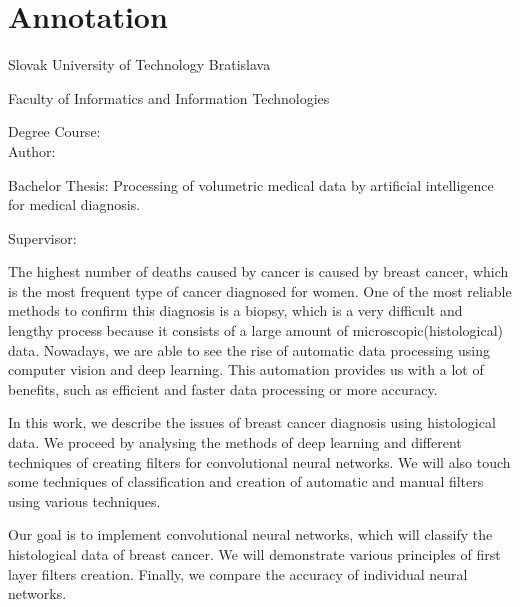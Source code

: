 \thispagestyle{empty}

\section*{Annotation}

\begin{minipage}[t]{1\columnwidth}%
Slovak University of Technology Bratislava 

Faculty of Informatics and Information Technologies

Degree Course: \myStudyProgram\\

Author: \myName

Bachelor Thesis: Processing of volumetric medical data by artificial intelligence for medical diagnosis.

Supervisor: \mySupervisor

\myDate%
\end{minipage}

\bigskip{}
\hspace{10mm}The highest number of deaths caused by cancer is caused by breast cancer, which is the most frequent type of cancer diagnosed for women. One of the most reliable methods to confirm this diagnosis is a biopsy, which is a very difficult and lengthy process because it consists of a large amount of microscopic(histological) data. Nowadays, we are able to see the rise of automatic data processing using computer vision and deep learning. This automation provides us with a lot of benefits, such as efficient and faster data processing or more accuracy.

\hspace{10mm}In this work, we describe the issues of breast cancer diagnosis using histological data. We proceed by analysing the methods of deep learning and different techniques of creating filters for convolutional neural networks. We will also touch some techniques of classification and creation of automatic and manual filters using various techniques.

\hspace{10mm}Our goal is to implement convolutional neural networks, which will classify the histological data of breast cancer. We will demonstrate various principles of first layer filters creation. Finally, we compare the accuracy of individual neural networks.


\newpage{}\thispagestyle{empty}\medskip{}


\newpage{}

\newpage
\thispagestyle{empty}
\mbox{}
\newpage


